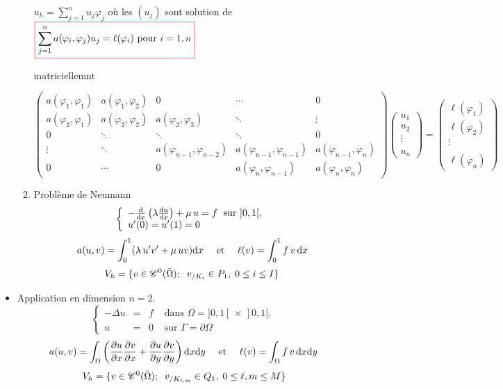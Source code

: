 \documentclass{article}
\def \de {{\rm d}}
\newcommand{\myredbox}[1]{\fcolorbox{red}{white}{$\displaystyle#1$}}
\begin{document}
\begin{itemize}[label=\textbullet, font=\small \color{blue}]
\begin{enumerate}
\begin{center}
\begin{tikzpicture}[domain=0:5]
\end{tikzpicture}
 \end{center}
 $u_h=\sum_{j=1}^nu_j\varphi_j$ où les $(u_j)$ sont solution de $\myredbox{\sum_{j=1}^na(\varphi_i,\varphi_j)u_j=\ell(\varphi_i)\mbox{ pour  }i=1,n}$
 
matriciellemnt
 
 
 
 \[
\left(\begin{array}{ccccc}
a(\varphi_1,\varphi_1)&a(\varphi_1,\varphi_2)&0&\cdots&0\\
a(\varphi_2,\varphi_1)&a(\varphi_2,\varphi_2)&a(\varphi_2,\varphi_3)&\ddots&\vdots\\
0&  \ddots &\ddots&\ddots&0\\
\vdots &\ddots &a(\varphi_{n-1},\varphi_{n-2})&a(\varphi_{n-1},\varphi_{n-1})&a(\varphi_{n-1},\varphi_{n})\\
   0&\cdots &0&a(\varphi_{n},\varphi_{n-1}) &a(\varphi_{n},\varphi_{n})
\end{array}\right)
\left(\begin{array}{c}
u_1\\u_2\\ \vdots \\ \\ u_n
\end{array}\right) =\left(\begin{array}{c}
\ell(\varphi_1)\\\ell(\varphi_2)\\ \vdots \\  \\ \ell(\varphi_n)
\end{array}\right)
\]

\item Problème de Neumann
\[\left\{\begin{array}{l}
-\frac{\de}{\de x}\left(\lambda \frac{\de u}{\de x}\right)+\mu\, u = f \; \mbox{ sur } ]0,1[,\\
u'(0)=u'(1)=0
\end{array}\right.\]
\[a(u,v)=\int_0^1(\lambda\, u'v'+\mu\, u v)\de x\quad \mbox{ et }\quad \ell(v)=\int_0^1 f\, v\, \de x\]
\[V_h=\{ v\in {\cal C}^0(\bar{\Omega});\;\; v_{/K_i}\in P_1,\; 0\leq i\leq I\}\]
\end{enumerate}
\item Application en dimension $n=2$.
\[\left\{\begin{array}{rlll}
-\Delta u &=& f & \mbox{ dans }\Omega= ]0,1[\,\times\, ]0,1[,\\
u&=&0 &\mbox{ sur }\Gamma=\partial \Omega
\end{array}\right.\]
\[a(u,v)=\int_\Omega\left(\frac{\partial u}{\partial x}\frac{\partial v}{\partial x}+\frac{\partial u}{\partial y}\frac{\partial v}{\partial y}\right)\de x\de y\quad \mbox{ et }\quad \ell(v)=\int_\Omega f\, v\, \de x\de y\]
\[V_h=\{ v\in {\cal C}^0(\bar{\Omega});\;\; v_{/K_{\ell,m}}\in Q_1,\; 0\leq \ell,m\leq M\}\]



\end{itemize}
\end{document}
